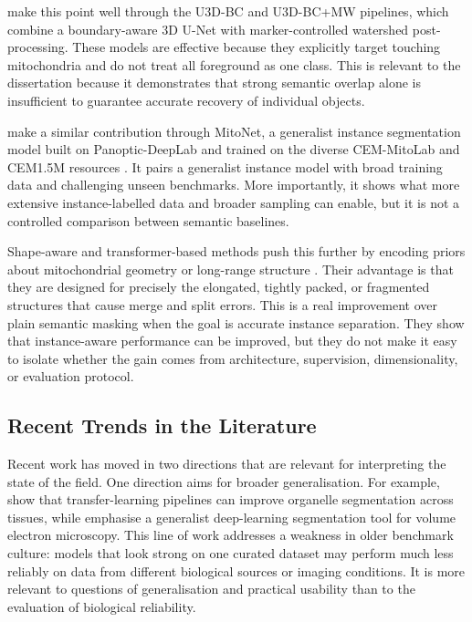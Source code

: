 \documentclass[logo,bsc,singlespacing,parskip,online]{infthesis}
\begin{document}
\citet{wei2020mitoem} make this point well through the U3D-BC and U3D-BC+MW pipelines,
which combine a boundary-aware 3D U-Net with marker-controlled watershed
post-processing. These models are effective because they explicitly target
touching mitochondria and do not treat all foreground as one class. This is relevant to the
dissertation because it demonstrates that strong semantic overlap alone
is insufficient to guarantee accurate recovery of individual objects. 

\citet{conrad2023instance} make a similar contribution through MitoNet, a generalist
instance segmentation model built on Panoptic-DeepLab
\citep{cheng2020panopticdeeplab} and trained on the diverse CEM-MitoLab and
CEM1.5M resources \citep{conrad2023instance}. It pairs a generalist instance
model with broad training data and challenging unseen benchmarks. More
importantly, it shows what more extensive instance-labelled data and broader sampling
can enable, but it is not a controlled comparison between semantic baselines.

Shape-aware and transformer-based methods push this further by encoding priors
about mitochondrial geometry or long-range structure
\citep{aswath2023segmentation, chen2025gctransnet}. Their advantage is that
they are designed for precisely the elongated, tightly packed, or fragmented
structures that cause merge and split errors. This is a real improvement over
plain semantic masking when the goal is accurate instance separation. 
They show that instance-aware
performance can be improved, but they do not make it easy to isolate whether
the gain comes from architecture, supervision, dimensionality, or evaluation
protocol.

\subsection{Recent Trends in the Literature}

Recent work has moved in two directions that are relevant for interpreting the
state of the field. One direction aims for broader generalisation. For example,
\citet{xie2025transfer} show that transfer-learning pipelines can improve
organelle segmentation across tissues, while \citet{huang2025generalist}
emphasise a generalist deep-learning segmentation tool for volume electron
microscopy. This line of work addresses a weakness in older benchmark
culture: models that look strong on one curated dataset may perform much less
reliably on data from different biological sources or imaging conditions.
It is more relevant to questions of generalisation and practical
usability than to the evaluation of biological reliability.
\end{document}
